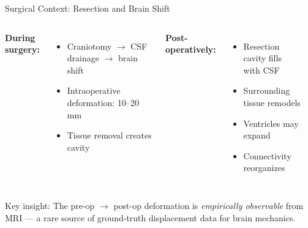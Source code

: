\begin{frame}{Surgical Context: Resection and Brain Shift}

  \begin{columns}[T]
    \textbf{During surgery:}
    \begin{itemize}
      \item Craniotomy $\to$ CSF drainage $\to$ brain shift
      \item Intraoperative deformation: 10--20\,mm
        \cite{Clatz2005}
      \item Tissue removal creates cavity
    \end{itemize}

    \bigskip

    \textbf{Post-operatively:}
    \begin{itemize}
      \item Resection cavity fills with CSF
      \item Surrounding tissue remodels
      \item Ventricles may expand
      \item Connectivity reorganizes
    \end{itemize}

    \begin{center}
    \end{center}
  \end{columns}

  \bigskip

  \alert{Key insight:} The pre-op $\to$ post-op deformation is
  \emph{empirically observable} from MRI --- a rare source of
  ground-truth displacement data for brain mechanics.

\end{frame}

